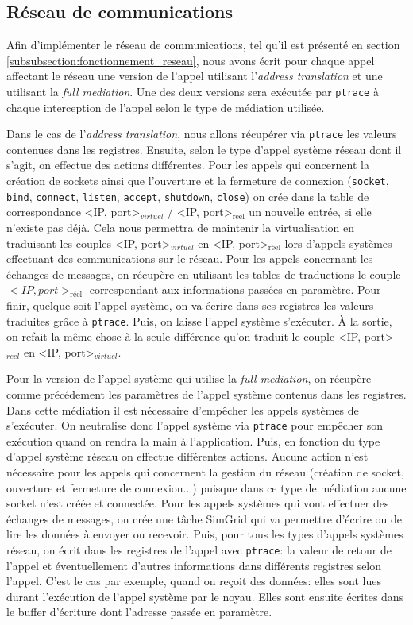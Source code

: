 \subsection{Réseau de communications}
\label{subsection:network_implementaion}

Afin d'implémenter le réseau de communications, tel qu'il est présenté en section \ref{subsubsection:fonctionnement_reseau}, nous avons écrit pour chaque appel affectant le réseau une version de l'appel utilisant l'\textit{address translation} et une utilisant la \textit{full mediation}. Une des deux versions sera exécutée par \texttt{ptrace} à chaque interception de l'appel selon le type de médiation utilisée.

Dans le cas de l'\textit{address translation}, nous allons récupérer via \texttt{ptrace} les valeurs contenues dans les registres. Ensuite, selon le type d'appel système réseau dont il s'agit, on effectue des actions différentes. Pour les appels qui concernent la création de sockets ainsi que l'ouverture et la fermeture de connexion (\texttt{socket}, \texttt{bind}, \texttt{connect}, \texttt{listen}, \texttt{accept}, \texttt{shutdown}, \texttt{close}) on crée dans la table de correspondance <IP, port>$_{virtuel}$ / <IP, port>$_{\text{réel}}$ un nouvelle entrée, si elle n'existe pas déjà. Cela nous permettra de maintenir la virtualisation en traduisant les couples <IP, port>$_{virtuel}$ en <IP, port>$_{\text{réel}}$ lors d'appels systèmes effectuant des communications sur le réseau. Pour les appels concernant les échanges de messages, on récupère en utilisant les tables de traductions le couple  $<IP, port>_{\text{réel}}$ correspondant aux informations passées en paramètre. Pour finir, quelque soit l'appel système, on va écrire dans ses registres les valeurs traduites grâce à \texttt{ptrace}. Puis, on laisse l'appel système s'exécuter. À la sortie, on refait la même chose à la seule différence qu'on traduit le couple  <IP, port>$_{reel}$ en <IP, port>$_{virtuel}$.

Pour la version de l'appel système qui utilise la \textit{full mediation}, on récupère comme précédement les paramètres de l'appel système contenus dans les registres. Dans cette médiation il est nécessaire d'empêcher les appels systèmes de s'exécuter. On neutralise donc l'appel système via \texttt{ptrace} pour empêcher son exécution quand on rendra la main à l'application. Puis, en fonction du type d'appel système réseau on effectue différentes actions. Aucune action n'est nécessaire pour les appels qui concernent la gestion du réseau (création de socket, ouverture et fermeture de connexion...) puisque dans ce type de médiation aucune socket n'est créée et connectée. Pour les appels systèmes qui vont effectuer des échanges de messages, on crée une tâche SimGrid qui va permettre d'écrire ou de lire les données à envoyer ou recevoir. Puis, pour tous les types d'appels systèmes réseau, on écrit dans les registres de l'appel avec \texttt{ptrace}: la valeur de retour de l'appel et éventuellement d'autres informations dans différents registres selon l'appel. C'est le cas par exemple, quand on reçoit des données: elles sont lues durant l'exécution de l'appel système par le noyau. Elles sont ensuite écrites dans le buffer d'écriture dont l'adresse passée en paramètre.
